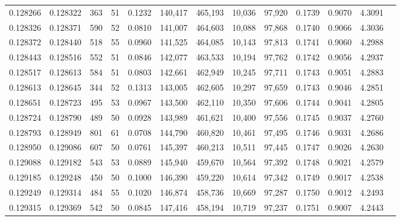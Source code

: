 \begin{tabular}{rrrrrrrrrrrrr}
0.128266 & 0.128322 &   363 &  51 &                                     0.1232 & 140,417 & 465,193 &  10,036 &  97,920 & 0.1739 & 0.9070 & 4.3091 \\
0.128326 & 0.128371 &   590 &  52 &                                     0.0810 & 141,007 & 464,603 &  10,088 &  97,868 & 0.1740 & 0.9066 & 4.3036 \\
0.128372 & 0.128440 &   518 &  55 &                                     0.0960 & 141,525 & 464,085 &  10,143 &  97,813 & 0.1741 & 0.9060 & 4.2988 \\
0.128443 & 0.128516 &   552 &  51 &                                     0.0846 & 142,077 & 463,533 &  10,194 &  97,762 & 0.1742 & 0.9056 & 4.2937 \\
0.128517 & 0.128613 &   584 &  51 &                                     0.0803 & 142,661 & 462,949 &  10,245 &  97,711 & 0.1743 & 0.9051 & 4.2883 \\
0.128613 & 0.128645 &   344 &  52 &                                     0.1313 & 143,005 & 462,605 &  10,297 &  97,659 & 0.1743 & 0.9046 & 4.2851 \\
0.128651 & 0.128723 &   495 &  53 &                                     0.0967 & 143,500 & 462,110 &  10,350 &  97,606 & 0.1744 & 0.9041 & 4.2805 \\
0.128724 & 0.128790 &   489 &  50 &                                     0.0928 & 143,989 & 461,621 &  10,400 &  97,556 & 0.1745 & 0.9037 & 4.2760 \\
0.128793 & 0.128949 &   801 &  61 &                                     0.0708 & 144,790 & 460,820 &  10,461 &  97,495 & 0.1746 & 0.9031 & 4.2686 \\
0.128950 & 0.129086 &   607 &  50 &                                     0.0761 & 145,397 & 460,213 &  10,511 &  97,445 & 0.1747 & 0.9026 & 4.2630 \\
0.129088 & 0.129182 &   543 &  53 &                                     0.0889 & 145,940 & 459,670 &  10,564 &  97,392 & 0.1748 & 0.9021 & 4.2579 \\
0.129185 & 0.129248 &   450 &  50 &                                     0.1000 & 146,390 & 459,220 &  10,614 &  97,342 & 0.1749 & 0.9017 & 4.2538 \\
0.129249 & 0.129314 &   484 &  55 &                                     0.1020 & 146,874 & 458,736 &  10,669 &  97,287 & 0.1750 & 0.9012 & 4.2493 \\
0.129315 & 0.129369 &   542 &  50 &                                     0.0845 & 147,416 & 458,194 &  10,719 &  97,237 & 0.1751 & 0.9007 & 4.2443 \\

\end{tabular}
